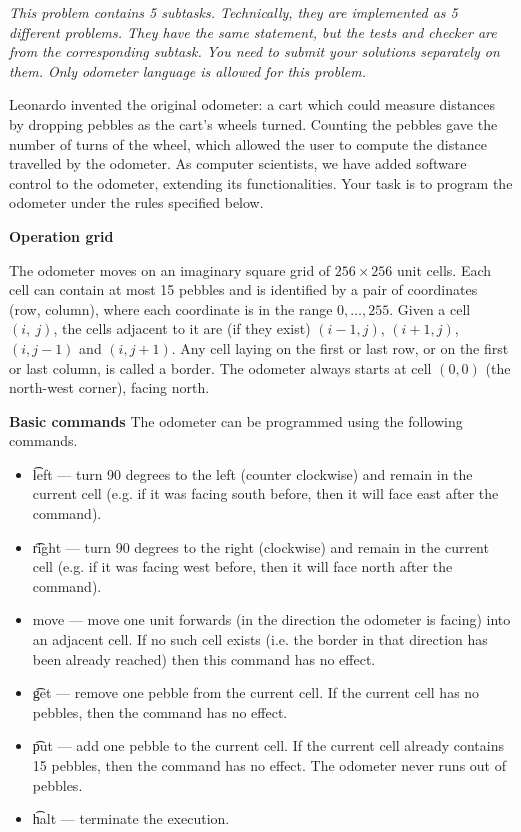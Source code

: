 {\it This problem contains 5 subtasks. Technically, they are implemented as 5 different problems. They have the same statement, but the tests and checker are from the corresponding subtask. You need to submit your solutions separately on them. Only odometer language is allowed for this problem. }

Leonardo invented the original odometer: a cart which could measure distances by dropping
pebbles as the cart's wheels turned. Counting the pebbles gave the number of turns of the wheel, which allowed the user to compute the distance travelled by the odometer. As computer scientists, we have added software control to the odometer, extending its functionalities. Your task is to program the odometer under the rules specified below.


{\bf Operation grid }

The odometer moves on an imaginary square grid of $256 \times 256$ unit cells. Each cell can contain at most 15 pebbles and is identified by a pair of coordinates (row, column), where each coordinate is in the range $0, \dots, 255$. Given a cell $(i,~j)$, the cells adjacent to it are (if they exist) $(i - 1, j)$, $(i + 1, j)$,$(i, j - 1)$ and $(i, j + 1)$. Any cell laying on the first or last row, or on the first or last column, is called
a border. The odometer always starts at cell $(0, 0)$ (the north-west corner), facing north.

{\bf Basic commands }
The odometer can be programmed using the following commands.
\begin{itemize}
\item \t{left} --- turn 90 degrees to the left (counter clockwise) and remain in the current cell (e.g. if it was facing south before, then it will face east after the command).
\item \t{right} --- turn 90 degrees to the right (clockwise) and remain in the current cell (e.g. if it was facing west before, then it will face north after the command).
\item move --- move one unit forwards (in the direction the odometer is facing) into an adjacent cell. If no such cell exists (i.e. the border in that direction has been already reached) then this command has no effect.
\item \t{get} --- remove one pebble from the current cell. If the current cell has no pebbles, then the command has no effect.
\item \t{put} --- add one pebble to the current cell. If the current cell already contains 15 pebbles, then the command has no effect. The odometer never runs out of pebbles.
\item \t{halt} --- terminate the execution.
\end{itemize}

